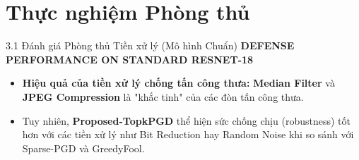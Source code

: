 \documentclass[10pt, xcolor=table]{beamer}
\begin{document}
\section{Thực nghiệm Phòng thủ}

\begin{frame}{3.1 Đánh giá Phòng thủ Tiền xử lý (Mô hình Chuẩn)}
    \centering
    \small \textbf{DEFENSE PERFORMANCE ON STANDARD RESNET-18}
    \vspace{0.1cm}
    
    \vspace{0.2cm}
    \begin{itemize}
        \item \textbf{Hiệu quả của tiền xử lý chống tấn công thưa:} \textbf{Median Filter} và \textbf{JPEG Compression} là "khắc tinh" của các đòn tấn công thưa.
        \item Tuy nhiên, \textbf{Proposed-TopkPGD} thể hiện sức chống chịu (robustness) tốt hơn với các tiền xử lý như Bit Reduction hay Random Noise khi so sánh với Sparse-PGD và GreedyFool.
    \end{itemize}
\end{frame}
\end{document}

